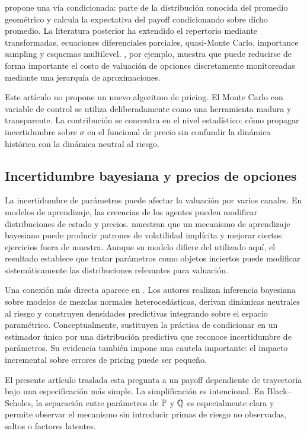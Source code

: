 \citet{curran1994} propone una vía condicionada: parte de la distribución conocida del promedio geométrico y calcula la expectativa del payoff condicionando sobre dicho promedio. La literatura posterior ha extendido el repertorio mediante transformadas, ecuaciones diferenciales parciales, quasi-Monte Carlo, importance sampling y esquemas multilevel. \citet{kahale2020}, por ejemplo, muestra que puede reducirse de forma importante el costo de valuación de opciones discretamente monitoreadas mediante una jerarquía de aproximaciones.

Este artículo no propone un nuevo algoritmo de pricing. El Monte Carlo con variable de control se utiliza deliberadamente como una herramienta madura y transparente. La contribución se concentra en el nivel estadístico: cómo propagar incertidumbre sobre $\sigma$ en el funcional de precio sin confundir la dinámica histórica con la dinámica neutral al riesgo.

\subsection{Incertidumbre bayesiana y precios de opciones}

La incertidumbre de parámetros puede afectar la valuación por varios canales. En modelos de aprendizaje, las creencias de los agentes pueden modificar distribuciones de estado y precios. \citet{guidolin2003} muestran que un mecanismo de aprendizaje bayesiano puede producir patrones de volatilidad implícita y mejorar ciertos ejercicios fuera de muestra. Aunque su modelo difiere del utilizado aquí, el resultado establece que tratar parámetros como objetos inciertos puede modificar sistemáticamente las distribuciones relevantes para valuación.

Una conexión más directa aparece en \citet{romboutsstentoft2014}. Los autores realizan inferencia bayesiana sobre modelos de mezclas normales heterocedásticas, derivan dinámicas neutrales al riesgo y construyen densidades predictivas integrando sobre el espacio paramétrico. Conceptualmente, sustituyen la práctica de condicionar en un estimador único por una distribución predictiva que reconoce incertidumbre de parámetros. Su evidencia también impone una cautela importante: el impacto incremental sobre errores de pricing puede ser pequeño.

El presente artículo traslada esta pregunta a un payoff dependiente de trayectoria bajo una especificación más simple. La simplificación es intencional. En Black--Scholes, la separación entre parámetros de $\mathbb{P}$ y $\mathbb{Q}$ es especialmente clara y permite observar el mecanismo sin introducir primas de riesgo no observadas, saltos o factores latentes.

